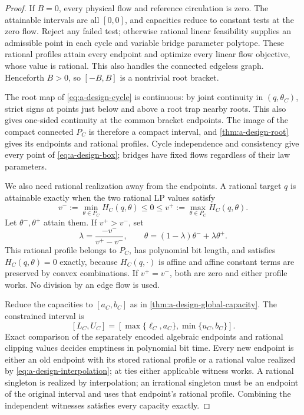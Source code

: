 \begin{proof}
If $B=0$, every physical flow and reference circulation is zero.
The attainable intervals are all $[0,0]$, and capacities reduce to
constant tests at the zero flow.  Reject any failed test; otherwise
rational linear feasibility supplies an admissible point in each
cycle and variable bridge parameter polytope.  These rational profiles
attain every endpoint and optimize every linear flow objective, whose
value is rational.  This also handles the connected edgeless graph.
Henceforth $B>0$, so $[-B,B]$ is a nontrivial root bracket.

The root map of \eqref{eq:a-design-cycle} is continuous: by joint
continuity in $(q,\theta_C)$, strict signs at points just below and
above a root trap nearby roots.  This also gives one-sided continuity
at the common bracket endpoints.  The image of the compact connected
$P_C$ is therefore a compact interval, and \cref{thm:a-design-root}
gives its endpoints and rational profiles.
Cycle independence and consistency give every point of
\eqref{eq:a-design-box}; bridges have fixed flows regardless of their
law parameters.

We also need rational realization away from the endpoints.
A rational target $q$ is attainable exactly when the two rational LP
values satisfy
\[
 v^-:=\min_{\theta\in P_C}H_C(q,\theta)\le0
 \le v^+:=\max_{\theta\in P_C}H_C(q,\theta).
\]
Let $\theta^-,\theta^+$ attain them.  If $v^+>v^-$, set
\begin{equation}
 \lambda=\frac{-v^-}{v^+-v^-},\qquad
 \theta=(1-\lambda)\theta^-+\lambda\theta^+.
 \label{eq:a-design-interpolation}
\end{equation}
This rational profile belongs to $P_C$, has polynomial bit length, and
satisfies $H_C(q,\theta)=0$ exactly, because $H_C(q,\cdot)$ is affine
and affine constant terms are preserved by convex combinations.  If
$v^+=v^-$, both are zero and either profile works.  No division by an
edge flow is used.

Reduce the capacities to $[a_C,b_C]$ as in
\cref{thm:a-design-global-capacity}.  The constrained interval is
\[
 [L_C,U_C]=[\max\{\ell_C,a_C\},\min\{u_C,b_C\}].
\]
Exact comparison of the separately encoded algebraic endpoints and
rational clipping values decides emptiness in polynomial bit time.
Every new endpoint is either an old endpoint with its stored rational
profile or a rational value realized by
\eqref{eq:a-design-interpolation}; at ties either applicable witness
works.  A rational singleton is realized by interpolation; an
irrational singleton must be an endpoint of the original interval and
uses that endpoint's rational profile.  Combining the independent
witnesses satisfies every capacity exactly.


\end{proof}
